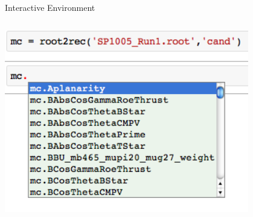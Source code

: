 \documentclass{beamer}
\begin{document}
\begin{frame}[fragile, shrink=5]{Interactive Environment}
\begin{columns}
\begin{column}{0.5\textwidth}
		\includegraphics[width=0.8\textwidth]{pic/inumpy.png}
	\end{column}
	\end{columns}
\end{frame}
\end{document}
